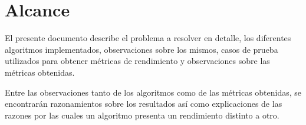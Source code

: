 \section{Alcance}

El presente documento describe el problema a resolver en detalle,
los diferentes algoritmos implementados,
observaciones sobre los mismos,
casos de prueba utilizados para obtener métricas de rendimiento
y observaciones sobre las métricas obtenidas.

Entre las observaciones tanto de los algoritmos como de las métricas
obtenidas, se encontrarán razonamientos sobre los resultados así
como explicaciones de las razones por las cuales un algoritmo
presenta un rendimiento distinto a otro.
